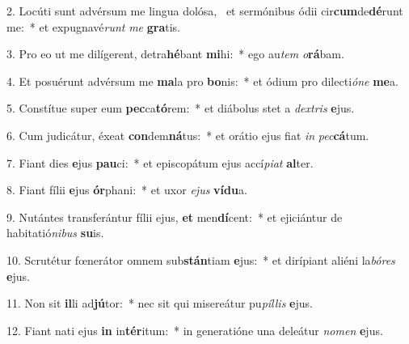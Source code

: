 2. Locúti sunt advérsum me lingua dolósa, \dag\  et sermónibus ódii cir\textbf{cum}de\textbf{dé}runt me:~*  et expugnavé\textit{runt} \textit{me} \textbf{gra}tis.\

3. Pro eo ut me dilígerent, detra\textbf{hé}bant \textbf{mi}hi:~*  ego au\textit{tem} \textit{o}\textbf{rá}bam.\

4. Et posuérunt advérsum me \textbf{ma}la pro \textbf{bo}nis:~*  et ódium pro dilecti\textit{ó}\textit{ne} \textbf{me}a.\

5. Constítue super eum \textbf{pec}ca\textbf{tó}rem:~*  et diábolus stet a \textit{dex}\textit{tris} \textbf{e}jus.\

6. Cum judicátur, éxeat \textbf{con}dem\textbf{ná}tus:~*  et orátio ejus fiat \textit{in} \textit{pec}\textbf{cá}tum.\

7. Fiant dies \textbf{e}jus \textbf{pau}ci:~*  et episcopátum ejus accí\textit{pi}\textit{at} \textbf{al}ter.\

8. Fiant fílii \textbf{e}jus \textbf{ór}phani:~*  et uxor \textit{e}\textit{jus} \textbf{ví}\textbf{du}a.\

9. Nutántes transferántur fílii ejus, \textbf{et} men\textbf{dí}cent:~*  et ejiciántur de habitatió\textit{ni}\textit{bus} \textbf{su}is.\

10. Scrutétur fœnerátor omnem sub\textbf{stán}tiam \textbf{e}jus:~*  et dirípiant aliéni la\textit{bó}\textit{res} \textbf{e}jus.\

11. Non sit \textbf{il}li ad\textbf{jú}tor:~*  nec sit qui misereátur pu\textit{píl}\textit{lis} \textbf{e}jus.\

12. Fiant nati ejus \textbf{in} in\textbf{tér}itum:~*  in generatióne una deleátur \textit{no}\textit{men} \textbf{e}jus.\

